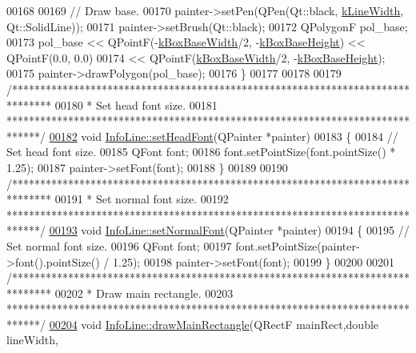 \begin{DoxyCode}
00168 
00169   \textcolor{comment}{// Draw base.}
00170   painter->setPen(QPen(Qt::black, \hyperlink{class_info_line_ad072bc8ef178113c36c3d480c7d637ac}{kLineWidth}, Qt::SolidLine));
00171   painter->setBrush(Qt::black);
00172   QPolygonF pol\_base;
00173   pol\_base << QPointF(-\hyperlink{class_info_line_aad905589137b80ba75d9a1c49535eb1a}{kBoxBaseWidth}/2, -\hyperlink{class_info_line_ab50f47aa54c45def219859e9da3755e6}{kBoxBaseHeight}) << QPointF(0.0, 0.0)
00174            << QPointF(\hyperlink{class_info_line_aad905589137b80ba75d9a1c49535eb1a}{kBoxBaseWidth}/2, -\hyperlink{class_info_line_ab50f47aa54c45def219859e9da3755e6}{kBoxBaseHeight});
00175   painter->drawPolygon(pol\_base);
00176 \}
00177 
00178 
00179 \textcolor{comment}{/*******************************************************************************}
00180 \textcolor{comment}{ * Set head font size.}
00181 \textcolor{comment}{ ******************************************************************************/}
\hypertarget{infoline_8cpp_source_l00182}{}\hyperlink{class_info_line_a389ea4f5085b60d03022b94e636f11d1}{00182} \textcolor{keywordtype}{void} \hyperlink{class_info_line_a389ea4f5085b60d03022b94e636f11d1}{InfoLine::setHeadFont}(QPainter *painter)
00183 \{
00184   \textcolor{comment}{// Set head font size.}
00185   QFont font;
00186   font.setPointSize(font.pointSize() * 1.25);
00187   painter->setFont(font);
00188 \}
00189 
00190 \textcolor{comment}{/*******************************************************************************}
00191 \textcolor{comment}{ * Set normal font size.}
00192 \textcolor{comment}{ ******************************************************************************/}
\hypertarget{infoline_8cpp_source_l00193}{}\hyperlink{class_info_line_a4d5084d616c878cb717e8445db0023c1}{00193} \textcolor{keywordtype}{void} \hyperlink{class_info_line_a4d5084d616c878cb717e8445db0023c1}{InfoLine::setNormalFont}(QPainter *painter)
00194 \{
00195   \textcolor{comment}{// Set normal font size.}
00196   QFont font;
00197   font.setPointSize(painter->font().pointSize() / 1.25);
00198   painter->setFont(font);
00199 \}
00200 
00201 \textcolor{comment}{/*******************************************************************************}
00202 \textcolor{comment}{ * Draw main rectangle.}
00203 \textcolor{comment}{ ******************************************************************************/}
\hypertarget{infoline_8cpp_source_l00204}{}\hyperlink{class_info_line_a3a0f83ad98fe674513dab679e22cba42}{00204} \textcolor{keywordtype}{void} \hyperlink{class_info_line_a3a0f83ad98fe674513dab679e22cba42}{InfoLine::drawMainRectangle}(QRectF mainRect,\textcolor{keywordtype}{double} lineWidth,

\end{DoxyCode}
